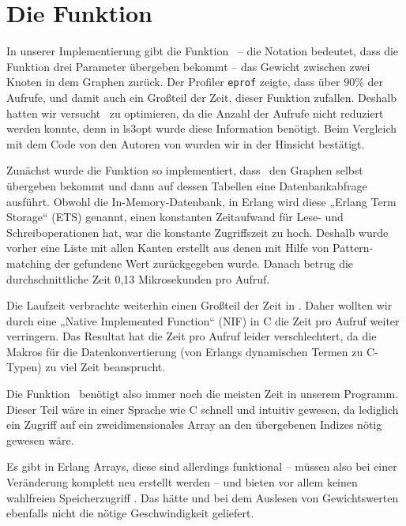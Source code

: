 \section{Die Funktion \gtwght}
\label{sec:get-weight}

In unserer Implementierung gibt die Funktion \gtwght\ – die Notation
bedeutet, dass die Funktion drei Parameter übergeben bekommt – das
Gewicht zwischen zwei Knoten in dem Graphen zurück.  Der Profiler
\lstinline!eprof!  zeigte, dass über 90\% der Aufrufe, und damit auch
ein Großteil der Zeit, dieser Funktion zufallen.  Deshalb hatten wir
versucht \gtwght\ zu optimieren, da die Anzahl der Aufrufe nicht
reduziert werden konnte, denn in ls3opt wurde diese Information
benötigt.  Beim Vergleich mit dem Code von den Autoren von \cite{gapx}
wurden wir in der Hinsicht bestätigt. %

Zunächst wurde die Funktion so implementiert, dass \gtwght\ den
Graphen selbst übergeben bekommt und dann auf dessen Tabellen eine
Datenbankabfrage ausführt.  Obwohl die In-Memory-Datenbank, in Erlang
wird diese „Erlang Term Storage“ (ETS) genannt, einen konstanten
Zeitaufwand für Lese- und Schreiboperationen hat, war die konstante
Zugriffszeit zu hoch.  Deshalb wurde vorher eine Liste mit allen
Kanten erstellt aus denen mit Hilfe von Pattern-matching der gefundene
Wert zurückgegeben wurde.  Danach betrug die durchschnittliche Zeit
0,13 Mikrosekunden pro Aufruf.

Die Laufzeit verbrachte weiterhin einen Großteil der Zeit in \gtwght.
Daher wollten wir durch eine „Native Implemented Function“ (NIF) in C
die Zeit pro Aufruf weiter verringern.  Das Resultat hat die Zeit pro
Aufruf leider verschlechtert, da die Makros für die Datenkonvertierung
(von Erlangs dynamischen Termen zu C-Typen) zu viel Zeit beansprucht.

Die Funktion \gtwght\ benötigt also immer noch die meisten Zeit in
unserem Programm.  Dieser Teil wäre in einer Sprache wie C schnell und
intuitiv gewesen, da lediglich ein Zugriff auf ein zweidimensionales
Array an den übergebenen Indizes nötig gewesen wäre.

Es gibt in Erlang Arrays, diese sind allerdings funktional – müssen
also bei einer Veränderung komplett neu erstellt werden – und bieten
vor allem keinen wahlfreien Speicherzugriff \cite[Kapitel~11]{lyse}.
Das hätte und bei dem Auslesen von Gewichtswerten ebenfalls nicht die
nötige Geschwindigkeit geliefert. %
